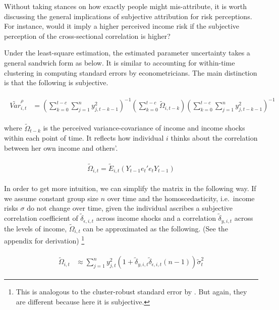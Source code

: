 \documentclass[12pt,notitlepage,onecolumn,aps,pra]{article}
\begin{document}
Without taking stances on how exactly people might mis-attribute, it is
worth discussing the general implications of subjective attribution for
risk perceptions. For instance, would it imply a higher perceived income
risk if the subjective perception of the cross-sectional correlation is
higher?

Under the least-square estimation, the estimated parameter uncertainty
takes a general sandwich form as below. It is similar to accounting for
within-time clustering in computing standard errors by econometricians.
The main distinction is that the following is subjective.

\begin{eqnarray}
\begin{split}
\tilde {Var}^{\rho}_{i,t} & =   (\sum^{t-c}_{k=0}\sum^{n}_{j=1}y^2_{j,t-k-1})^{-1}(\sum^{t-c}_{k=0}\tilde \Omega_{i,t-k})(\sum^{t-c}_{k=0}\sum^{n}_{j=1}y^2_{j,t-k-1})^{-1}
\end{split}
\end{eqnarray}

where \(\tilde \Omega_{t-k}\) is the perceived variance-covariance of
income and income shocks within each point of time. It reflects how
individual \(i\) thinks about the correlation between her own income and
others'.

\begin{eqnarray}
\begin{split}
\tilde \Omega_{i,t} = \tilde E_{i,t}(Y_{t-1}e_{t}'e_{t}Y_{t-1})
\end{split}
\end{eqnarray}

In order to get more intuition, we can simplify the matrix in the
following way. If we assume constant group size \(n\) over time and the
homoscedasticity, i.e.~income risks \(\sigma\) do not change over time,
given the individual ascribes a subjective correlation coefficient of
\(\tilde \delta_{\epsilon, i,t}\) across income shocks and a correlation
\(\tilde \delta_{y, i,t}\) across the levels of income,
\(\tilde \Omega_{i,t}\) can be approximated as the following. (See the
appendix for derivation)
\footnote{This is analogous to the cluster-robust standard error by \cite{cameron2011robust}. But again, they are different because here it is subjective.}

\begin{eqnarray}
\begin{split}
\tilde \Omega_{i,t} & \approx \sum^{n}_{j=1}y^2_{j,t} (1+\tilde \delta_{y,i,t}\tilde \delta_{\epsilon,i,t}(n-1))\tilde \sigma^2_{t}
\end{split}
\end{eqnarray}
\end{document}
